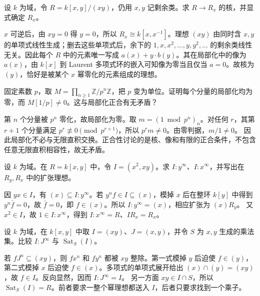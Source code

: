 \begin{exercise}\label{b3:ex:02-fraction-kernel}
	设 \(k\) 为域，令 \(R=k[x,y]/(xy)\)，仍用 \(x,y\) 记剩余类。求 \(R\rightarrow R_x\) 的核，并显式确定 \(R_x\)。
\end{exercise}
\begin{solution}
	\(x\) 可逆后，由 \(xy=0\) 得 \(y=0\)，所以 \(R_x\cong k[x,x^{-1}]\)。理想 \((xy)\) 由同时含 \(x,y\) 的单项式线性生成；删去这些单项式后，余下的 \(1,x,x^2,\ldots,y,y^2,\ldots\) 的剩余类线性无关。因此每个 \(R\) 中的元素唯一写成 \(a(x)+y\cdot b(y)\)。其在局部化中的像为 \(a(x)\)，由 \(k[x]\) 到 Laurent 多项式环的嵌入可知像为零当且仅当 \(a=0\)。故核为 \((y)\)，恰好是被某个 \(x\) 幂零化的元素组成的理想。
\end{solution}

\begin{exercise}\label{b3:ex:02-infinite-product}
	固定素数 \(p\)，取 \(M=\prod_{n\ge1}\mathbb Z/p^n\mathbb Z\)，把 \(p\) 变为单位。证明每个分量的局部化均为零，而 \(M[1/p]\ne0\)。这与局部化正合有无矛盾？
\end{exercise}
\begin{solution}
	第 \(n\) 个分量被 \(p^n\) 零化，故局部化为零。取 \(m=(1\bmod p^n)_n\)。对任何 \(r\)，其第 \(r+1\) 个分量满足 \(p^r\not\equiv0\pmod{p^{r+1}}\)，所以 \(p^rm\ne0\)。由零判据，\(m/1\ne0\)。 因此局部化不必与无限直积交换。正合性讨论的是核、像和有限的正合条件，不包含任意无限直积相容性，故无矛盾。
\end{solution}

\begin{exercise}\label{b3:ex:02-saturation-computation}
	设 \(k\) 为域。在 \(R=k[x,y]\) 中，令 \(I=(x^2,xy)\)。求 \(I:y^\infty\)、\(I:x^\infty\)，并写出在 \(R_y,R_x\) 中的扩张理想。
\end{exercise}
\begin{solution}
	因 \(yx\in I\)，有 \((x)\subseteq I:y^\infty\)。若 \(y^n f\in I\subseteq(x)\)，模掉 \(x\) 后在整环 \(k[y]\) 中得到 \(y^n\bar f=0\)，故 \(\bar f=0\)，即 \(f\in(x)\)。所以 \(I:y^\infty=(x)\)，相应扩张为 \((x)R_y\)。 又 \(x^2\in I\)，故 \(1\in I:x^\infty\)，得到 \(I:x^\infty=R\)、\(IR_x=R_x\)。
\end{solution}

\begin{exercise}\label{b3:ex:02-two-saturations}
	设 \(k\) 为域，在 \(k[x,y]\) 中取 \(I=(xy)\)、\(J=(x,y)\)，并令 \(S\) 为 \(x,y\) 生成的乘法集。比较 \(I:J^\infty\) 与 \(\operatorname{Sat}_S(I)\)。
\end{exercise}
\begin{solution}
	若 \(fJ^n\subseteq(xy)\)，则 \(fx^n\) 和 \(fy^n\) 都被 \(xy\) 整除。第一式模掉 \(y\) 后迫使 \(f\in(y)\)，第二式模掉 \(x\) 后迫使 \(f\in(x)\)。多项式的单项式展开给出 \((x)\cap(y)=(xy)\)，故 \(f\in I\)。反向显然，因而 \(I:J^\infty=I\)。 另一方面 \(xy\in I\cap S\)，所以 \(\operatorname{Sat}_S(I)=R\)。前者要求一整个幂理想都送入 \(I\)，后者只要求找到一个乘子。
\end{solution}

